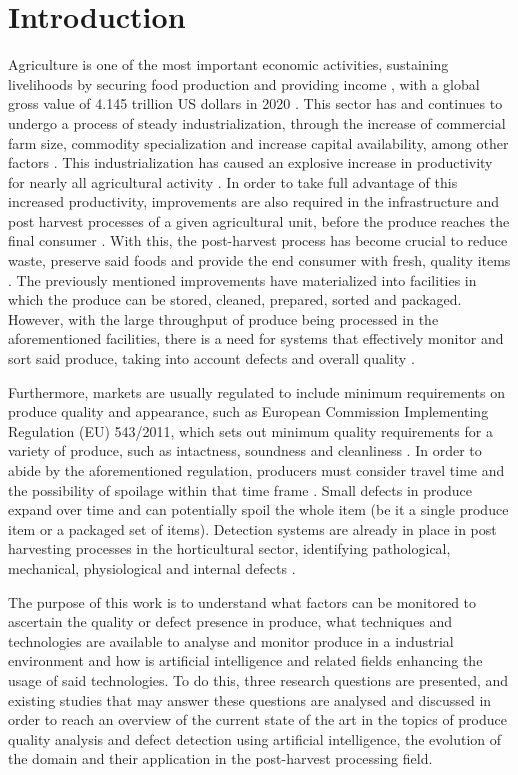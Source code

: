 \documentclass[conference]{IEEEtran}
\begin{document}
\section{Introduction}

Agriculture is one of the most important economic activities, sustaining livelihoods by securing food production and providing income \cite{FDES-1}, with a global gross value of 4.145 trillion US dollars in 2020 \cite{FAO1}. This sector has and continues to undergo a process of steady industrialization, through the increase of commercial farm size, commodity specialization and increase capital availability, among other factors \cite{10.2307/1243439}. This industrialization has caused an explosive increase in productivity for nearly all agricultural activity \cite{owidagriculturalproduction}. In order to take full advantage of this increased productivity, improvements are also required in the infrastructure and post harvest processes of a given agricultural unit, before the produce reaches the final consumer \cite{Food_and_Agriculture_Organization_of_the_United_Nations2010-hb}. With this, the post-harvest process has become crucial to reduce waste, preserve said foods and provide the end consumer with fresh, quality items \cite{foods6010008}. The previously mentioned improvements have materialized into facilities in which the produce can be stored, cleaned, prepared, sorted and packaged. However, with the large throughput of produce being processed in the aforementioned facilities, there is a need for systems that effectively monitor and sort said produce, taking into account defects and overall quality \cite{Mahalik2009}.

Furthermore, markets are usually regulated to include minimum requirements on produce quality and appearance, such as European Commission Implementing Regulation (EU) 543/2011, which sets out minimum quality requirements for a variety of produce, such as intactness, soundness and cleanliness \cite{eu-5432011}. In order to abide by the aforementioned regulation, producers must consider travel time and the possibility of spoilage within that time frame \cite{biv081}. Small defects in produce expand over time and can potentially spoil the whole item (be it a single produce item or a packaged set of items). Detection systems are already in place in post harvesting processes in the horticultural sector, identifying pathological, mechanical, physiological and internal defects \cite{Nturambirwe2020}.

The purpose of this work is to understand what factors can be monitored to ascertain the quality or defect presence in produce, what techniques and technologies are available to analyse and monitor produce in a industrial environment and how is artificial intelligence and related fields enhancing the usage of said technologies. To do this, three research questions are presented, and existing studies that may answer these questions are analysed and discussed in order to reach an overview of the current state of the art in the topics of produce quality analysis and defect detection using artificial intelligence, the evolution of the domain and their application in the post-harvest processing field.
\end{document}
